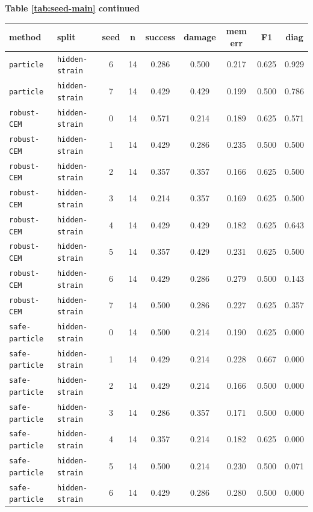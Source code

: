 \documentclass{article}
\begin{document}
\begin{center}
\textbf{Table \ref{tab:seed-main} continued}\\[0.4ex]
\begin{tabular}{llccccccc}
\toprule
method & split & seed & n & success & damage & mem err & F1 & diag \\
\midrule
\texttt{particle} & \texttt{hidden-strain} & 6 & 14 & 0.286 & 0.500 & 0.217 & 0.625 & 0.929 \\
\texttt{particle} & \texttt{hidden-strain} & 7 & 14 & 0.429 & 0.429 & 0.199 & 0.500 & 0.786 \\
\texttt{robust-CEM} & \texttt{hidden-strain} & 0 & 14 & 0.571 & 0.214 & 0.189 & 0.625 & 0.571 \\
\texttt{robust-CEM} & \texttt{hidden-strain} & 1 & 14 & 0.429 & 0.286 & 0.235 & 0.500 & 0.500 \\
\texttt{robust-CEM} & \texttt{hidden-strain} & 2 & 14 & 0.357 & 0.357 & 0.166 & 0.625 & 0.500 \\
\texttt{robust-CEM} & \texttt{hidden-strain} & 3 & 14 & 0.214 & 0.357 & 0.169 & 0.625 & 0.500 \\
\texttt{robust-CEM} & \texttt{hidden-strain} & 4 & 14 & 0.429 & 0.429 & 0.182 & 0.625 & 0.643 \\
\texttt{robust-CEM} & \texttt{hidden-strain} & 5 & 14 & 0.357 & 0.429 & 0.231 & 0.625 & 0.500 \\
\texttt{robust-CEM} & \texttt{hidden-strain} & 6 & 14 & 0.429 & 0.286 & 0.279 & 0.500 & 0.143 \\
\texttt{robust-CEM} & \texttt{hidden-strain} & 7 & 14 & 0.500 & 0.286 & 0.227 & 0.625 & 0.357 \\
\texttt{safe-particle} & \texttt{hidden-strain} & 0 & 14 & 0.500 & 0.214 & 0.190 & 0.625 & 0.000 \\
\texttt{safe-particle} & \texttt{hidden-strain} & 1 & 14 & 0.429 & 0.214 & 0.228 & 0.667 & 0.000 \\
\texttt{safe-particle} & \texttt{hidden-strain} & 2 & 14 & 0.429 & 0.214 & 0.166 & 0.500 & 0.000 \\
\texttt{safe-particle} & \texttt{hidden-strain} & 3 & 14 & 0.286 & 0.357 & 0.171 & 0.500 & 0.000 \\
\texttt{safe-particle} & \texttt{hidden-strain} & 4 & 14 & 0.357 & 0.214 & 0.182 & 0.625 & 0.000 \\
\texttt{safe-particle} & \texttt{hidden-strain} & 5 & 14 & 0.500 & 0.214 & 0.230 & 0.500 & 0.071 \\
\texttt{safe-particle} & \texttt{hidden-strain} & 6 & 14 & 0.429 & 0.286 & 0.280 & 0.500 & 0.000 \\

\end{tabular}
\end{center}
\end{document}
